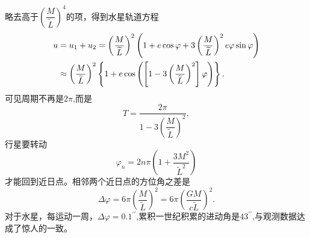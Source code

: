 \documentclass[11pt, a4paper, oneside, onecolumn]{ctexart}
\numberwithin{equation}{subsection}
\begin{document}
略去高于$\left(\dfrac{M}{\widetilde{L}}\right)^{4}$的项，得到水星轨道方程
\begin{align}
u&=u_{1}+u_{2}=\left(\frac{M}{\widetilde{L}}\right)^{2}\left(1+e\cos\varphi+3\left(\frac{M}{\widetilde{L}}\right)^{2}e\varphi\sin\varphi\right)\notag\\
&\approx\left(\frac{M}{\widetilde{L}}\right)^{2}\left\{1+e\cos\left(\left[1-3\left(\frac{M}{\widetilde{L}}\right)^{2}\right]\varphi\right)\right\}.
\end{align}
可见周期不再是$2\pi$,而是
\begin{equation}
T=\frac{2\pi}{1-3\left(\dfrac{M}{\widetilde{L}}\right)^{2}},
\end{equation}
行星要转动
\begin{equation}
\varphi_{n}=2n\pi\left(1+\frac{3M^{2}}{\widetilde{L}^{2}}\right)
\end{equation}
才能回到近日点。相邻两个近日点的方位角之差是
\begin{equation}
\Delta{}\varphi=6\pi\left(\frac{M}{\widetilde{L}}\right)^{2}=6\pi\left(\frac{GM}{c\widetilde{L}}\right)^{2}.
\end{equation}
对于水星，每运动一周，$\Delta{}\varphi=0.1^{\prime\prime}$,累积一世纪积累的进动角是$43^{\prime\prime}$,与观测数据达成了惊人的一致。
\end{document}
